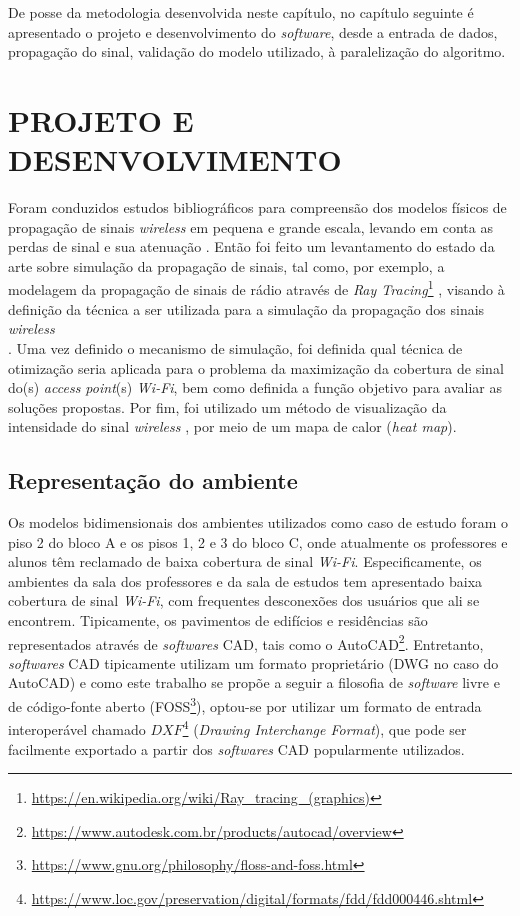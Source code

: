 \documentclass[
	12pt,				%
	twoside,			%
	a4paper,			%
	english,			%
	french,				%
	spanish,			%
	brazil				%
	]{abntex2}
\begin{document}
De posse da metodologia desenvolvida neste capítulo, no capítulo
seguinte é apresentado o projeto e desenvolvimento do \emph{software},
desde a entrada de dados, propagação do sinal, validação do modelo
utilizado, à paralelização do algoritmo.

\chapter{PROJETO E DESENVOLVIMENTO}\label{sec:projeto}

Foram conduzidos estudos bibliográficos para compreensão dos modelos
físicos de propagação de sinais \emph{wireless} em pequena e grande
escala, levando em conta as perdas de sinal e sua atenuação
\cite{ALMERS}. Então foi feito um levantamento do estado da arte sobre
simulação da propagação de sinais, tal como, por exemplo, a modelagem da
propagação de sinais de rádio através de \emph{Ray Tracing}\footnote{\url{https://en.wikipedia.org/wiki/Ray_tracing_(graphics)}}
\cite{YUN}, visando à definição da técnica a ser utilizada para a
simulação da propagação dos sinais \emph{wireless}\\
\cite{LENTZ, NAJNUDEL, SANDEEP}. Uma vez definido o mecanismo de
simulação, foi definida qual técnica de otimização seria aplicada para o
problema da maximização da cobertura de sinal do(s) \emph{access
point}(s) \emph{Wi-Fi}, bem como definida a função objetivo para avaliar
as soluções propostas. Por fim, foi utilizado um método de visualização
da intensidade do sinal \emph{wireless} \cite{RENSBURG,SULAIMAN} , por
meio de um mapa de calor (\emph{heat map}).

\section{Representação do
ambiente}\label{representauxe7uxe3o-do-ambiente}

Os modelos bidimensionais dos ambientes utilizados como caso de estudo
foram o piso 2 do bloco A e os pisos 1, 2 e 3 do bloco C, onde
atualmente os professores e alunos têm reclamado de baixa cobertura de
sinal \emph{Wi-Fi}. Especificamente, os ambientes da sala dos
professores e da sala de estudos tem apresentado baixa cobertura de
sinal \emph{Wi-Fi}, com frequentes desconexões dos usuários que ali se
encontrem. Tipicamente, os pavimentos de edifícios e residências são
representados através de \emph{softwares} CAD, tais como o
AutoCAD\footnote{\url{https://www.autodesk.com.br/products/autocad/overview}}.
Entretanto, \emph{softwares} CAD tipicamente utilizam um formato
proprietário (DWG no caso do AutoCAD) e como este trabalho se propõe a
seguir a filosofia de \emph{software} livre e de código-fonte aberto
(FOSS\footnote{\url{https://www.gnu.org/philosophy/floss-and-foss.html}}),
optou-se por utilizar um formato de entrada interoperável chamado
\(DXF\)\footnote{\url{https://www.loc.gov/preservation/digital/formats/fdd/fdd000446.shtml}}
(\emph{Drawing Interchange Format}), que pode ser facilmente exportado a
partir dos \emph{softwares} CAD popularmente utilizados.
\end{document}
